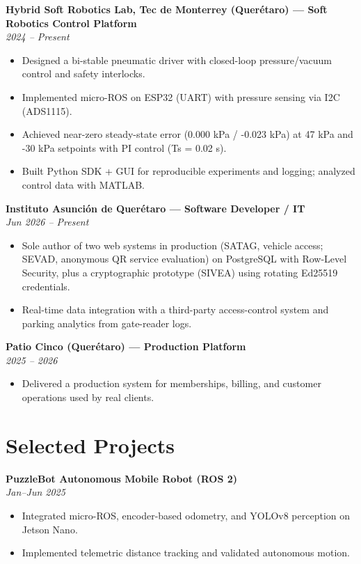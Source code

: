 \documentclass[9pt,letterpaper]{article}
\begin{document}
\textbf{Hybrid Soft Robotics Lab, Tec de Monterrey (Querétaro) — Soft Robotics Control Platform}\\
\textit{2024 -- Present}
\begin{itemize}[leftmargin=*]
  \item Designed a bi-stable pneumatic driver with closed-loop pressure/vacuum control and safety interlocks.
  \item Implemented micro-ROS on ESP32 (UART) with pressure sensing via I2C (ADS1115).
  \item Achieved near-zero steady-state error (0.000 kPa / -0.023 kPa) at 47 kPa and -30 kPa setpoints with PI control (Ts = 0.02 s).
  \item Built Python SDK + GUI for reproducible experiments and logging; analyzed control data with MATLAB.
\end{itemize}

\textbf{Instituto Asunción de Querétaro — Software Developer / IT}\\
\textit{Jun 2026 -- Present}
\begin{itemize}[leftmargin=*]
  \item Sole author of two web systems in production (SATAG, vehicle access; SEVAD, anonymous QR service evaluation) on PostgreSQL with Row-Level Security, plus a cryptographic prototype (SIVEA) using rotating Ed25519 credentials.
  \item Real-time data integration with a third-party access-control system and parking analytics from gate-reader logs.
\end{itemize}

\textbf{Patio Cinco (Querétaro) — Production Platform}\\
\textit{2025 -- 2026}
\begin{itemize}[leftmargin=*]
  \item Delivered a production system for memberships, billing, and customer operations used by real clients.
\end{itemize}

\section*{Selected Projects}
\textbf{PuzzleBot Autonomous Mobile Robot (ROS 2)}\\
\textit{Jan--Jun 2025}
\begin{itemize}[leftmargin=*]
  \item Integrated micro-ROS, encoder-based odometry, and YOLOv8 perception on Jetson Nano.
  \item Implemented telemetric distance tracking and validated autonomous motion.
\end{itemize}
\end{document}
